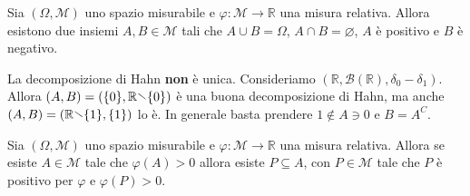 \begin{theorem}
    Sia \((\Omega, \mathcal{M})\) uno spazio misurabile e \(\varphi : \mathcal{M
    \to \mathbb{R}}\) una misura relativa. Allora esistono due insiemi \(A, B
    \in \mathcal{M}\) tali che \(A \cup B = \Omega\), \(A \cap B =
    \varnothing\), \(A\) è positivo e \(B\) è negativo.
\end{theorem}
\begin{remark}
    La decomposizione di Hahn \textbf{non} è unica. Consideriamo \((\mathbb{R},
    \mathcal{B}(\mathbb{R}), \delta_{0} - \delta_{1})\). Allora \((A,
    B) = (\{0\}, \mathbb{R} \sminus \{0\} )\) è una buona decomposizione di
    Hahn, ma anche \((A, B) = (\mathbb{R} \sminus \{1\}, \{1\} )\) lo è. In
    generale basta prendere \(1 \not\in A \ni 0\) e \(B = A^C\).
\end{remark}
\begin{lemma}
    Sia \((\Omega, \mathcal{M})\) uno spazio misurabile e \(\varphi :
    \mathcal{M} \to \mathbb{R}\) una misura relativa. Allora se esiste \(A \in
    \mathcal{M}\) tale che \(\varphi(A) > 0\) allora esiste \(P \subseteq A \),
    con \(P \in \mathcal{M}\) tale che \(P\) è positivo per \(\varphi\) e
    \(\varphi(P)>0\).
\end{lemma}
